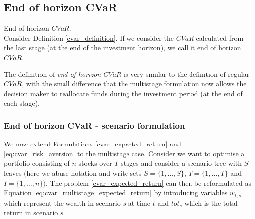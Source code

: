 \subsection{End of horizon CVaR}

\begin{defn}{End of horizon $CVaR$.} \\
Consider Definition \ref{cvar_definition}. If we consider the $CVaR$ calculated from the last stage (at the end of the investment horizon), we call it end of horizon $CVaR$.
\end{defn}
The definition of \textit{end of horizon $CVaR$} is very similar to the definition of regular $CVaR$, with the small difference that the multistage formulation now allows the decision maker to reallocate funds during the investment period (at the end of each stage). 

\subsubsection{End of horizon CVaR - scenario formulation}
We now extend Formulations \ref{cvar_expected_return} and \ref{eq:cvar_risk_aversion} to the multistage case. Consider we want to optimise a portfolio consisting of $n$ stocks over $T$ stages and consider a scenario tree with $S$ leaves (here we abuse notation and write sets $S=\{1,\dots,S\}$, $T=\{1,\dots,T\}$ and $I=\{1,\dots,n\})$. The problem \ref{cvar_expected_return} can then be reformulated as Equation \ref{eq:cvar_multistage_expected_return} by introducing variables $w_{t,s}$ which represent the wealth in scenario $s$ at time $t$ and $tot_s$ which is the total return in scenario $s$.

